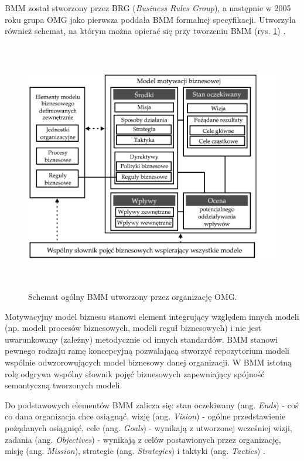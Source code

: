 BMM został stworzony przez BRG (\emph{Business Rules Group}), a następnie w 2005 roku grupa OMG jako pierwsza poddała BMM formalnej specyfikacji. Utworzyła również schemat, na którym można opierać się przy tworzeniu BMM (rys. \ref{BMM_schem}) \cite{AnaWesHal}.

\begin{figure}[h!tbp]
\begin{centering}
\includegraphics[width=12cm, height=11cm]{img/BMM_PL.png}
\caption[Schemat ogólny BMM utworzony przez organizację OMG.]{Schemat ogólny BMM utworzony przez organizację OMG. \cite{BMMOmg}}\label{BMM_schem}
\end{centering}
\end{figure}

Motywacyjny model biznesu stanowi element integrujący względem innych modeli (np. modeli procesów biznesowych, modeli reguł biznesowych) i nie jest uwarunkowany (zależny) metodycznie od innych standardów. BMM stanowi pewnego rodzaju ramę koncepcyjną pozwalającą stworzyć repozytorium modeli wspólnie odwzorowujących model biznesowy danej organizacji. W BMM istotną rolę odgrywa wspólny słownik pojęć biznesowych zapewniający spójność semantyczną tworzonych modeli.

Do podstawowych elementów BMM zalicza się: stan oczekiwany (ang. \emph{Ends}) - coś co dana organizacja chce osiągnąć, wizję (ang. \emph{Vision}) - ogólne przedstawienie pożądanych osiągnięć, cele (ang. \emph{Goals}) - wynikają z utworzonej wcześniej wizji, zadania (ang. \emph{Objectives}) - wynikają z celów postawionych przez organizację, misję (ang. \emph{Mission}), strategie (ang. \emph{Strategies}) i taktyki (ang. \emph{Tactics}) \cite{AnaWesHal}. 

